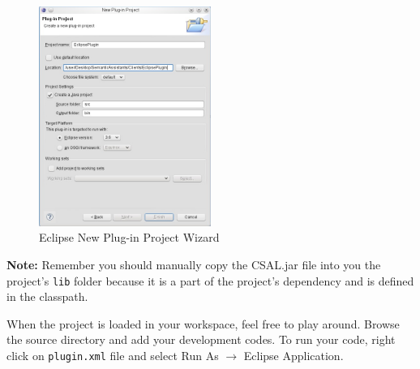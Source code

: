 \begin{figure}[htb]
\begin{center}
  \includegraphics[width=0.5\textwidth]{pictures/eclipse_project_wizard.jpg}
  \caption{Eclipse New Plug-in Project Wizard}
  \label{fig:eclipse_project_wizard}
\end{center}
\end{figure}

\textbf{Note:} Remember you should manually copy the CSAL.jar file into you the
project's \texttt{lib} folder because it is a part of the project's dependency
and is defined in the classpath.

When the project is loaded in your workspace, feel free to play around. Browse
the source directory and add your development codes. To run your code, right
click on \texttt{plugin.xml} file and select Run As $\rightarrow$ Eclipse
Application.